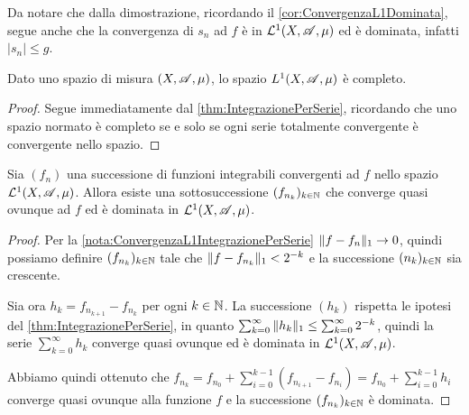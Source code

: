 \begin{remark}\label{nota:ConvergenzaL1IntegrazionePerSerie}
	Da notare che dalla dimostrazione, ricordando il \cref{cor:ConvergenzaL1Dominata}, segue anche che la convergenza di $s_n$ ad $f$ è in $\mathcal L^1(X,\mathscr A,\mu)$ ed è dominata, infatti $|s_n|\le g$.
\end{remark}


\begin{corollary}
	Dato uno spazio di misura $(X,\mathscr A,\mu)$, lo spazio $L^1(X,\mathscr A,\mu)$ è completo.
\end{corollary}

\begin{proof}
	Segue immediatamente dal \cref{thm:IntegrazionePerSerie}, ricordando che uno spazio normato è completo se e solo se ogni serie totalmente convergente è convergente nello spazio.
\end{proof}

\begin{proposition}\label{prop:L1ImplicaSottosuccessioneQuasiOvunque}
	Sia $(f_n)$ una successione di funzioni integrabili convergenti ad $f$ nello spazio $\mathcal L^1(X,\mathscr A,\mu)$. Allora esiste una sottosuccessione $(f_{n_k})_{k\in\mathbb N}$ che converge quasi ovunque ad $f$ ed è dominata in $\mathcal L^1(X,\mathscr A,\mu)$.
\end{proposition}

\begin{proof}
	Per la \cref{nota:ConvergenzaL1IntegrazionePerSerie} $\Vert f-f_n\Vert_1\to 0$, quindi possiamo definire $(f_{n_k})_{k\in\mathbb N}$ tale che $\Vert f-f_{n_k}\Vert_1<2^{-k}$ e la successione $(n_k)_{k\in\mathbb N}$ sia crescente.
	
	Sia ora $h_k=f_{n_{k+1}}-f_{n_k}$ per ogni $k\in\mathbb N$. La successione $(h_k)$ rispetta le ipotesi del \cref{thm:IntegrazionePerSerie}, in quanto $\sum_{k=0}^\infty \Vert h_k\Vert_1\le \sum_{k=0}^\infty 2^{-k}$, quindi la serie $\sum_{k=0}^\infty h_k$ converge quasi ovunque ed è dominata in $\mathcal L^1(X,\mathscr A,\mu)$.
	
	Abbiamo quindi ottenuto che $f_{n_k}=f_{n_0}+\sum_{i=0}^{k-1}(f_{n_{i+1}}-f_{n_i})=f_{n_0}+\sum_{i=0}^{k-1} h_i$ converge quasi ovunque alla funzione $f$ e la successione $(f_{n_k})_{k\in\mathbb N}$ è dominata.
\end{proof}

